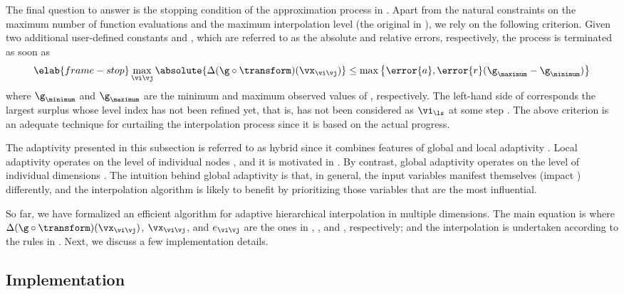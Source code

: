 The final question to answer is the stopping condition of the approximation
process in . Apart from the natural constraints on the
maximum number of function evaluations and the maximum interpolation level (the
original \ls in ), we rely on the following
criterion. Given two additional user-defined constants  and ,
which are referred to as the absolute and relative errors, respectively, the
process is terminated as soon as
\begin{equation} \elab{frame-stop}
  \max_{\vi \vj} \absolute{\Delta(\g \circ \transform)(\vx_{\vi \vj})} \leq \max \left\{ \error{a}, \error{r} (\g_\maximum - \g_\minimum) \right\}
\end{equation}
where $\g_\minimum$ and $\g_\maximum$ are the minimum and maximum observed
values of \g, respectively. The left-hand side of  corresponds
the largest surplus whose level index has not been refined yet, that is, has not
been considered as $\vi_{\ls}$ at some step \ls. The above criterion is an
adequate technique for curtailing the interpolation process since it is based on
the actual progress.

The adaptivity presented in this subsection is referred to as hybrid since it
combines features of global and local adaptivity \cite{jakeman2012}. Local
adaptivity operates on the level of individual nodes \cite{ma2009}, and it is
motivated in . By contrast, global adaptivity operates on
the level of individual dimensions \cite{klimke2006}. The intuition behind
global adaptivity is that, in general, the input variables manifest themselves
(impact \g) differently, and the interpolation algorithm is likely to benefit by
prioritizing those variables that are the most influential.

\conclusioncut
So far, we have formalized an efficient algorithm for adaptive hierarchical
interpolation in multiple dimensions. The main equation is
 where $\Delta(\g \circ \transform)(\vx_{\vi \vj})$,
$\vx_{\vi \vj}$, and $e_{\vi \vj}$ are the ones in
, , and ,
respectively; and the interpolation is undertaken according to the rules in
. Next, we discuss a few implementation details.

\subsection{Implementation}

